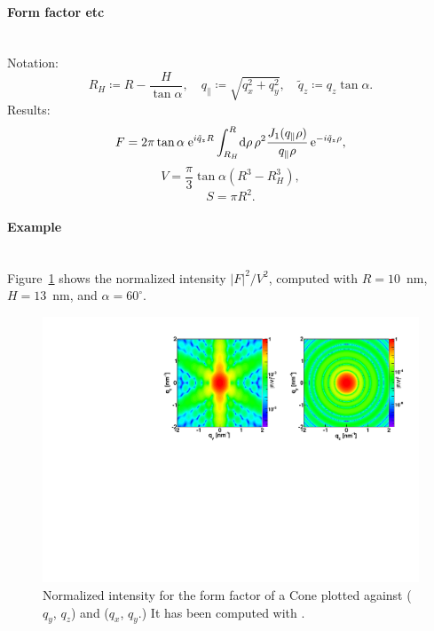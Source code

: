 \paragraph{Form factor etc}\strut\\
Notation:
\begin{equation*}
  R_H \coloneqq R-\dfrac{H}{\tan \alpha}, \quad
  q_{\parallel} \coloneqq \sqrt{q_x^2+ q_y^2}, \quad
  \tilde{q}_z \coloneqq q_z \tan\alpha.
\end{equation*}
Results:
\begin{equation*}
  F = 2\pi \tan\alpha\; \text{e}^{i\tilde{q}_z R}
      \int_{R_H}^R \!\text{d}\rho\, \rho^2
        \frac{J_1(q_{\parallel}\rho)}{q_{\parallel}\rho}\,\text{e}^{-i\tilde{q}_z \rho},
\end{equation*}
\begin{equation*}
  V = \dfrac{\pi}{3}\tan\alpha  \left( R^3 - R_H^3\right),
\end{equation*}
\begin{equation*}
  S=\pi R^2.
\end{equation*}

\paragraph{Example}\strut\\
Figure~\ref{fig:FFConeEx} shows the normalized intensity
$|F|^2/V^2$, computed with $R=10$~nm, $H=13$~nm, and $\alpha=60^{\circ}$.
\begin{figure}[H]
\begin{center}
\includegraphics[angle=-90,width=\textwidth]{fig/ff/figffcone.pdf}
\end{center}
\caption{Normalized intensity for the form factor of a Cone plotted against ($q_y$, $q_z$) and ($q_x$, $q_y$.) It
  has been  computed with .}
\label{fig:FFConeEx}
\end{figure}

